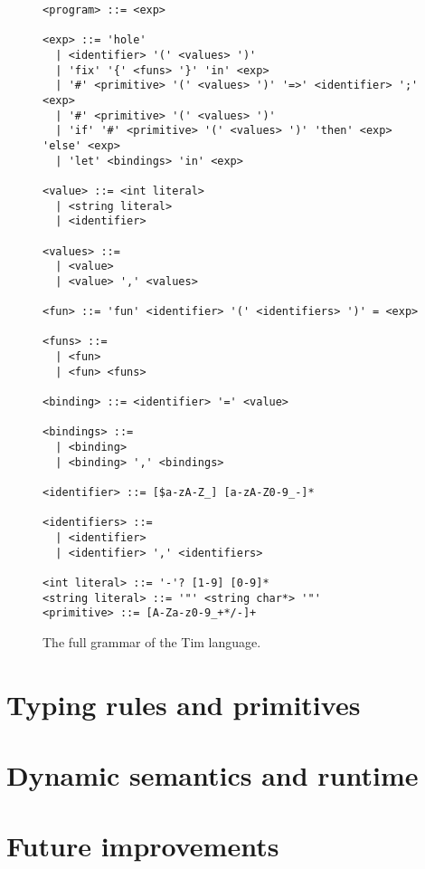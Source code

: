 \begin{figure}
  \begin{lstlisting}
<program> ::= <exp>

<exp> ::= 'hole'
  | <identifier> '(' <values> ')'
  | 'fix' '{' <funs> '}' 'in' <exp>
  | '#' <primitive> '(' <values> ')' '=>' <identifier> ';' <exp>
  | '#' <primitive> '(' <values> ')'
  | 'if' '#' <primitive> '(' <values> ')' 'then' <exp> 'else' <exp>
  | 'let' <bindings> 'in' <exp>

<value> ::= <int literal>
  | <string literal>
  | <identifier>

<values> ::=
  | <value>
  | <value> ',' <values>

<fun> ::= 'fun' <identifier> '(' <identifiers> ')' = <exp>

<funs> ::=
  | <fun>
  | <fun> <funs>

<binding> ::= <identifier> '=' <value>

<bindings> ::=
  | <binding>
  | <binding> ',' <bindings>

<identifier> ::= [$a-zA-Z_] [a-zA-Z0-9_-]*

<identifiers> ::=
  | <identifier>
  | <identifier> ',' <identifiers>

<int literal> ::= '-'? [1-9] [0-9]*
<string literal> ::= '"' <string char*> '"'
<primitive> ::= [A-Za-z0-9_+*/-]+
  \end{lstlisting}
  \caption{The full grammar of the Tim language.}
  \label{fig:tim_grammar}
\end{figure}

\section{Typing rules and primitives}
\label{sec:tim_operations}

\section{Dynamic semantics and runtime}
\label{sec:tim_runtime}

\section{Future improvements}
\label{sec:tim_future}


